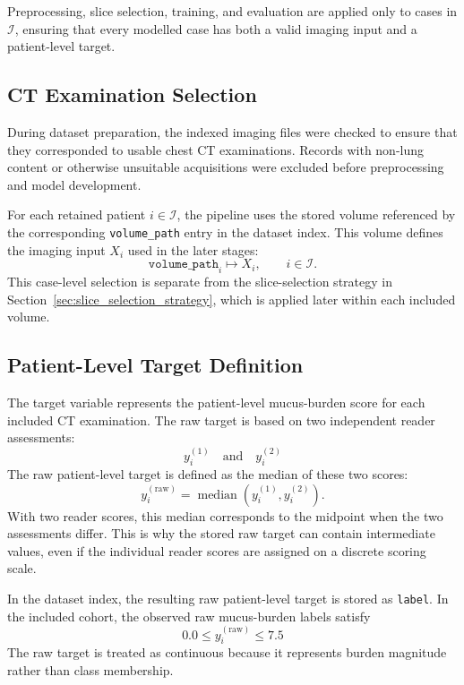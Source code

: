 Preprocessing, slice selection, training, and evaluation are applied only to cases in \(\mathcal{I}\), ensuring that every modelled case has both a valid imaging input and a patient-level target.


\subsection{CT Examination Selection}
\label{sec:ct_examination_selection}

During dataset preparation, the indexed imaging files were checked to ensure that they corresponded to usable chest CT examinations. Records with non-lung content or otherwise unsuitable acquisitions were excluded before preprocessing and model development.

For each retained patient \(i \in \mathcal{I}\), the pipeline uses the stored volume referenced by the corresponding \texttt{volume\_path} entry in the dataset index. This volume defines the imaging input \(X_i\) used in the later stages:
\[
\texttt{volume\_path}_i \longmapsto X_i,
\qquad i \in \mathcal{I}.
\]
This case-level selection is separate from the slice-selection strategy in Section~\ref{sec:slice_selection_strategy}, which is applied later within each included volume.


\subsection{Patient-Level Target Definition}
\label{sec:patient_level_target_definition}

The target variable represents the patient-level mucus-burden score for each included CT examination. The raw target is based on two independent reader assessments:
\[
y_i^{(1)}
\quad \text{and} \quad
y_i^{(2)}
\]
The raw patient-level target is defined as the median of these two scores:
\[
y_i^{(\mathrm{raw})}
=
\operatorname{median}\!\left(y_i^{(1)}, y_i^{(2)}\right).
\]
With two reader scores, this median corresponds to the midpoint when the two assessments differ. This is why the stored raw target can contain intermediate values, even if the individual reader scores are assigned on a discrete scoring scale.

In the dataset index, the resulting raw patient-level target is stored as \texttt{label}. In the included cohort, the observed raw mucus-burden labels satisfy
\[
0.0 \leq y_i^{(\mathrm{raw})} \leq 7.5
\]
The raw target is treated as continuous because it represents burden magnitude rather than class membership.

